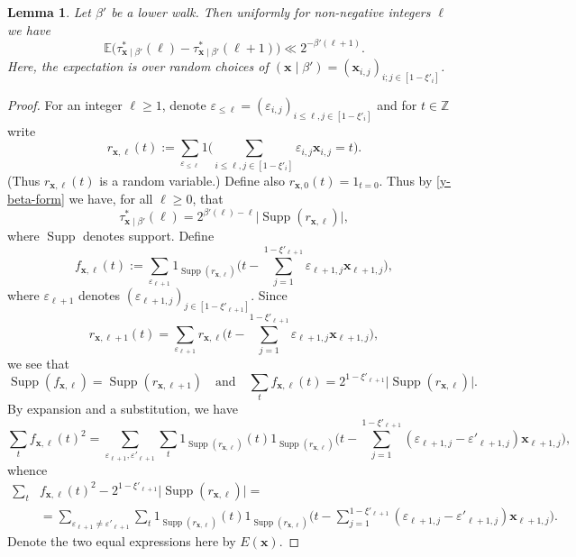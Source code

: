 \documentclass[11pt,reqno]{amsart}
\numberwithin{equation}{section}
\newtheorem{lemma}[theorem]{Lemma}
\theoremstyle{definition}
\theoremstyle{remark}
\newcommand{\mb}{\mathbb}
\newcommand{\mbf}{\mathbf}
\newcommand{\eps}{\varepsilon}
\newcommand\Supp{\operatorname{Supp}}
\renewcommand{\le}{\leqslant}
\renewcommand{\ge}{\geqslant}
\newcommand\Z{\mathbb{Z}}
\begin{document}
\begin{lemma}\label{lem23}
Let $\beta'$ be a lower walk. Then uniformly for non-negative integers $\ell$ we have
\begin{equation} \label{bd-on-y-beta} \mb{E}\big( \tau^*_{\mbf{x} \mid \beta'}(\ell) -  \tau^*_{\mbf{x} \mid \beta'}(\ell+1) \big) \ll 2^{-\beta'(\ell+1)}. \end{equation}
Here, the expectation is over random choices of $(\mbf{x} \mid \beta') = (\mbf{x}_{i,j})_{i;j \in [1 - \xi'_i]}$.
\end{lemma}
\begin{proof} For an integer $\ell \ge 1$, denote $\eps_{\le \ell} = (\eps_{i,j})_{i \le \ell, j \in [1 - \xi'_i]}$ and for $t \in \Z$ write
\[ r_{\mbf{x},\ell}(t) := \sum_{\eps_{\le \ell}} 1 \big( \sum_{i \le \ell, j \in [1 - \xi'_i]} \eps_{i,j} \mbf{x}_{i,j} = t \big).\] (Thus $r_{\mbf{x},\ell}(t)$ is a random variable.) Define also $r_{\mbf{x},0}(t) = 1_{t = 0}$. Thus by \cref{y-beta-form} we have, for all $\ell \ge 0$, that
\begin{equation}\label{tau-def} \tau^*_{\mbf{x} \mid \beta'}(\ell) = 2^{\beta'(\ell) - \ell} \big| \Supp(r_{\mbf{x},\ell})\big|,\end{equation} where $\Supp$ denotes support.
Define 
\[ f_{\mbf{x},\ell}(t) := \sum_{\eps_{\ell+1}} 1_{\Supp(r_{\mbf{x},\ell})} \big(t - \sum_{j = 1}^{1 - \xi'_{\ell+1}} \eps_{\ell+1, j} \mbf{x}_{\ell+1, j}\big),\] where $\eps_{\ell+1}$ denotes $(\eps_{\ell+1, j})_{j \in [1 - \xi'_{\ell+1}]}$. Since
\[ r_{\mbf{x},\ell+1}(t) = \sum_{\eps_{\ell+1}} r_{\mbf{x},\ell} \big(t - \sum_{j = 1}^{1 - \xi'_{\ell+1}} \eps_{\ell+1, j} \mbf{x}_{\ell+1, j}\big),\] we see that 
\begin{equation}\label{sup-rel-1} \Supp (f_{\mbf{x},\ell}) = \Supp (r_{\mbf{x},\ell+1}) \quad \mbox{and} \quad \sum_t f_{\mbf{x},\ell}(t) = 2^{1 - \xi'_{\ell+1}} \big|\Supp(r_{\mbf{x},\ell})\big|.\end{equation}
By expansion and a substitution, we have
\[ \sum_t f_{\mbf{x},\ell}(t)^2 = \sum_{\eps_{\ell+1}, \eps'_{\ell+1}} \sum_t 1_{\Supp(r_{\mbf{x},\ell})}(t) 1_{\Supp(r_{\mbf{x},\ell})}\Big( t - \sum_{j = 1}^{1 - \xi'_{\ell+1}} (\eps_{\ell+1, j} - \eps'_{\ell+1, j}) \mbf{x}_{\ell+1, j}\Big),\] whence
\begin{align*} \sum_t & f_{\mbf{x}, \ell}(t)^2 - 2^{1 - \xi'_{\ell+1}}\big|\Supp(r_{\mbf{x}, \ell})\big| =  \\ & = \sum_{\eps_{\ell+1} \ne \eps'_{\ell+1}} \sum_t 1_{\Supp(r_{\mbf{x}, \ell})}(t) 1_{\Supp(r_{\mbf{x}, \ell})}\Big( t - \sum_{j = 1}^{1 - \xi'_{\ell+1}} (\eps_{\ell+1, j} - \eps'_{\ell+1, j}) \mbf{x}_{\ell+1, j}\Big).\end{align*} Denote the two equal expressions here by $E(\mbf{x})$.

\end{proof}
\end{document}
